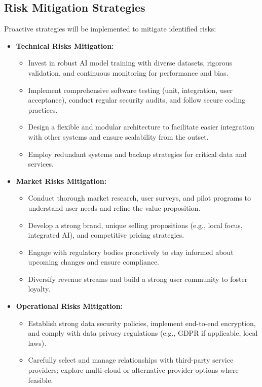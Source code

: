 \subsection{Risk Mitigation Strategies}
Proactive strategies will be implemented to mitigate identified risks:
\begin{itemize}
  \item \textbf{Technical Risks Mitigation:}
    \begin{itemize}
        \item Invest in robust AI model training with diverse datasets, rigorous validation, and continuous monitoring for performance and bias.
        \item Implement comprehensive software testing (unit, integration, user acceptance), conduct regular security audits, and follow secure coding practices.
        \item Design a flexible and modular architecture to facilitate easier integration with other systems and ensure scalability from the outset.
        \item Employ redundant systems and backup strategies for critical data and services.
    \end{itemize}
  \item \textbf{Market Risks Mitigation:}
    \begin{itemize}
        \item Conduct thorough market research, user surveys, and pilot programs to understand user needs and refine the value proposition.
        \item Develop a strong brand, unique selling propositions (e.g., local focus, integrated AI), and competitive pricing strategies.
        \item Engage with regulatory bodies proactively to stay informed about upcoming changes and ensure compliance.
        \item Diversify revenue streams and build a strong user community to foster loyalty.
    \end{itemize}
  \item \textbf{Operational Risks Mitigation:}
    \begin{itemize}
        \item Establish strong data security policies, implement end-to-end encryption, and comply with data privacy regulations (e.g., GDPR if applicable, local laws).
        \item Carefully select and manage relationships with third-party service providers; explore multi-cloud or alternative provider options where feasible.

\end{itemize}
\end{itemize}
